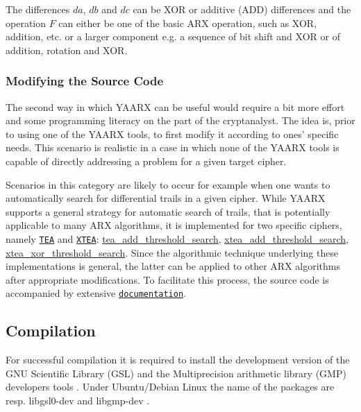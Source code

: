 \-The differences $da$, $db$ and $dc$ can be \-X\-O\-R or additive (\-A\-D\-D) differences and the operation $F$ can either be one of the basic \-A\-R\-X operation, such as \-X\-O\-R, addition, etc. or a larger component e.\-g. a sequence of bit shift and \-X\-O\-R or of addition, rotation and \-X\-O\-R.\hypertarget{index_scenario2_sec}{}\subsubsection{\-Modifying the Source Code}\label{index_scenario2_sec}
\-The second way in which \-Y\-A\-A\-R\-X can be useful would require a bit more effort and some programming literacy on the part of the cryptanalyst. \-The idea is, prior to using one of the \-Y\-A\-A\-R\-X tools, to first modify it according to ones' specific needs. \-This scenario is realistic in a case in which none of the \-Y\-A\-A\-R\-X tools is capable of directly addressing a problem for a given target cipher.

\-Scenarios in this category are likely to occur for example when one wants to automatically search for differential trails in a given cipher. \-While \-Y\-A\-A\-R\-X supports a general strategy for automatic search of trails, that is potentially applicable to many \-A\-R\-X algorithms, it is implemented for two specific ciphers, namely \href{https://en.wikipedia.org/wiki/Tiny_Encryption_Algorithm}{\tt \-T\-E\-A} and \href{https://en.wikipedia.org/wiki/XTEA}{\tt \-X\-T\-E\-A}\-: \hyperlink{tea-add-threshold-search_8cc_ab59db616cde68bf9245c7d24c98e3a6c}{tea\-\_\-add\-\_\-threshold\-\_\-search}, \hyperlink{xtea-add-threshold-search_8hh_a18a7f48b1b44dcf0c408b2988cec4cf5}{xtea\-\_\-add\-\_\-threshold\-\_\-search}, \hyperlink{xtea-xor-threshold-search_8hh_a04cc0c55d61b755d6b9435e301420f0f}{xtea\-\_\-xor\-\_\-threshold\-\_\-search}. \-Since the algorithmic technique underlying these implementations is general, the latter can be applied to other \-A\-R\-X algorithms after appropriate modifications. \-To facilitate this process, the source code is accompanied by extensive \href{file:///home/vpv/skcrypto/trunk/work/src/yaarx/doc/html/files.html}{\tt documentation}.\hypertarget{index_compilation_sec}{}\subsection{\-Compilation}\label{index_compilation_sec}
\-For successful compilation it is required to install the development version of the \-G\-N\-U \-Scientific \-Library (\-G\-S\-L) and the \-Multiprecision arithmetic library (\-G\-M\-P) developers tools . \-Under \-Ubuntu/\-Debian \-Linux the name of the packages are resp. libgsl0-\/dev and libgmp-\/dev .

